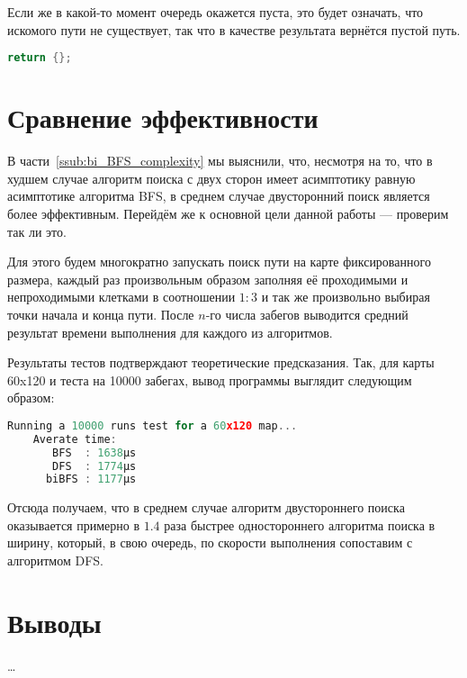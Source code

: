 \documentclass[a4paper, 12pt]{article}
\begin{document}
Если же в какой-то момент очередь окажется пуста, это  будет означать, что искомого пути не существует, так что в качестве результата вернётся пустой путь.
\begin{lstlisting}[language=C++]
    return {};
\end{lstlisting}

\section{Сравнение эффективности}
В части~\ref{ssub:bi_BFS_complexity} мы выяснили, что, несмотря на то, что в худшем случае алгоритм поиска с двух сторон имеет асимптотику равную асимптотике алгоритма BFS, в среднем случае двусторонний поиск является более эффективным. Перейдём же к основной цели данной работы --- проверим так ли это.

Для этого будем многократно запускать поиск пути на карте фиксированного размера, каждый раз произвольным образом заполняя её проходимыми и непроходимыми клетками в соотношении \({ 1 : 3 }\) и так же произвольно выбирая точки начала и конца пути. После \({ n }\)-го числа забегов выводится средний результат времени выполнения для каждого из алгоритмов.

Результаты тестов подтверждают теоретические предсказания. Так, для карты 60x120 и теста на 10000 забегах, вывод программы выглядит следующим образом:
\begin{lstlisting}[language=C++]
    Running a 10000 runs test for a 60x120 map...
    Averate time:
       BFS  : 1638µs
       DFS  : 1774µs
      biBFS : 1177µs
\end{lstlisting}

Отсюда получаем, что в среднем случае алгоритм двустороннего поиска оказывается примерно в \({ 1.4 }\) раза быстрее одностороннего алгоритма поиска в ширину, который, в свою очередь, по скорости выполнения сопоставим с алгоритмом DFS.

\section{Выводы}
\ldots
\end{document}
